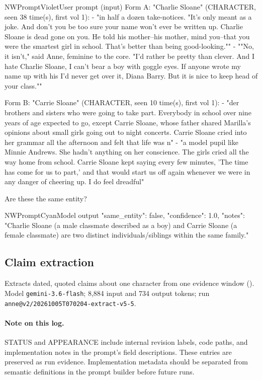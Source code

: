 \begin{nwprompt}{NWPromptViolet}{User prompt (input)}
Form A: "Charlie Sloane" (CHARACTER, seen 38 time(s), first vol 1):
  - "in half a dozen take-notices. "It's only meant as a joke. And don't you be too sure your name won't ever be written up. Charlie Sloane is dead gone on you. He told his mother--his mother, mind you--that you were the smartest girl in school. That's better than being good-looking.""
  - ""No, it isn't," said Anne, feminine to the core. "I'd rather be pretty than clever. And I hate Charlie Sloane, I can't bear a boy with goggle eyes. If anyone wrote my name up with his I'd never get over it, Diana Barry. But it is nice to keep head of your class.""

Form B: "Carrie Sloane" (CHARACTER, seen 10 time(s), first vol 1):
  - "der brothers and sisters who were going to take part. Everybody in school over nine years of age expected to go, except Carrie Sloane, whose father shared Marilla's opinions about small girls going out to night concerts. Carrie Sloane cried into her grammar all the afternoon and felt that life was n"
  - "a model pupil like Minnie Andrews. She hadn't anything on her conscience. The girls cried all the way home from school. Carrie Sloane kept saying every few minutes, 'The time has come for us to part,' and that would start us off again whenever we were in any danger of cheering up. I do feel dreadful"

Are these the same entity?
\end{nwprompt}

\begin{nwprompt}{NWPromptCyan}{Model output}
{"same_entity": false, "confidence": 1.0, "notes": "Charlie Sloane (a male classmate described as a boy) and Carrie Sloane (a female classmate) are two distinct individuals/siblings within the same family."}
\end{nwprompt}

\subsection*{Claim extraction}
Extracts dated, quoted claims about one character from one evidence window (\sys). Model \texttt{gemini-3.6-flash}; 8,884 input and 734 output tokens; run \nolinkurl{anne@v2/20261005T070204-extract-v5-5}.

\paragraph{Note on this log.} STATUS and APPEARANCE include internal revision labels,
code paths, and implementation notes in the prompt's field descriptions. These entries
are preserved as run evidence. Implementation metadata should be separated from semantic
definitions in the prompt builder before future runs.

